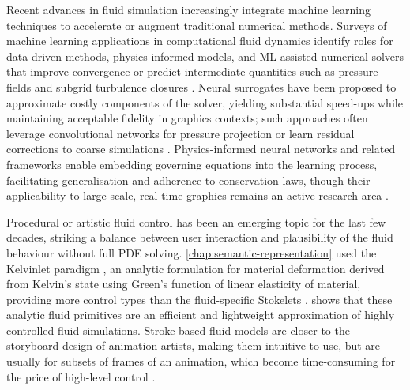 Recent advances in fluid simulation increasingly integrate machine learning techniques to accelerate or augment traditional numerical methods. Surveys of machine learning applications in computational fluid dynamics identify roles for data-driven methods, physics-informed models, and ML-assisted numerical solvers that improve convergence or predict intermediate quantities such as pressure fields and subgrid turbulence closures \cite{Huang2022NN}. Neural surrogates have been proposed to approximate costly components of the solver, yielding substantial speed-ups while maintaining acceptable fidelity in graphics contexts; such approaches often leverage convolutional networks for pressure projection or learn residual corrections to coarse simulations \cite{Tompson2017,Sousa2024}. Physics-informed neural networks and related frameworks enable embedding governing equations into the learning process, facilitating generalisation and adherence to conservation laws, though their applicability to large-scale, real-time graphics remains an active research area \cite{Brunton2025}.


Procedural or artistic fluid control has been an emerging topic for the last few decades, striking a balance between user interaction and plausibility of the fluid behaviour without full PDE solving. \cref{chap:semantic-representation} used the Kelvinlet paradigm \cite{DeGoes2017}, an analytic formulation for material deformation derived from Kelvin's state using Green's function of linear elasticity of material, providing more control types than the fluid-specific Stokelets \cite{Chwang1976}. \citep{Wejchert1991} shows that these analytic fluid primitives are an efficient and lightweight approximation of highly controlled fluid simulations. Stroke-based fluid models are closer to the storyboard design of animation artists, making them intuitive to use, but are usually for subsets of frames of an animation, which become time-consuming for the price of high-level control \cite{Xing2016,Patel2005,Yan2020b,Pan2013}. 

